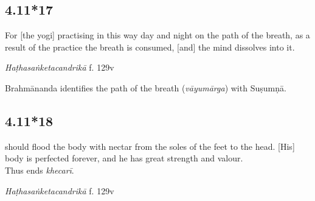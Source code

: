 \begin{ekdosis}
%

\subsection*{4.11*17}
\begin{translation}[hp04_011_17]
For [the yogi] practising in this way day and night on the path of the breath, as a result of the practice the breath is consumed, [and] the mind dissolves into it.
\end{translation}


\begin{testimonia}[hp04_011_17]
\emph{Haṭhasaṅketacandrikā} f. 129v
\begin{versinnote}
\end{versinnote}
\end{testimonia}

\begin{philcomm}[hp04_011_17]
Brahmānanda identifies the path of the breath (\emph{vāyumārga}) with Suṣumṇā.
\end{philcomm}

\subsection*{4.11*18}
\begin{translation} should flood the body with nectar from the soles of the feet to the head. [His] body is perfected forever, and he has great strength and valour.\\Thus ends \emph{khecarī}.
\end{translation}


\begin{testimonia}[hp04_011_18]
\emph{Haṭhasaṅketacandrikā} f. 129v
\begin{versinnote}
\end{versinnote}
\end{testimonia}



\end{ekdosis}
